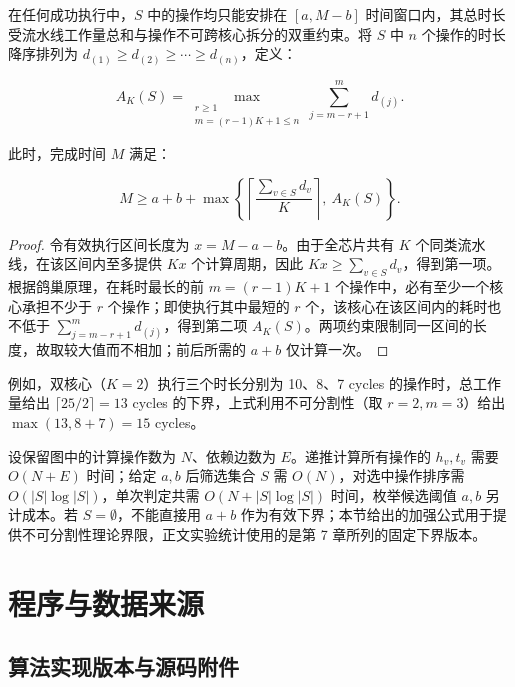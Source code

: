\documentclass[anonymous,withtoc]{gmcm2026}
\begin{document}
在任何成功执行中，\(S\) 中的操作均只能安排在 \([a, M - b]\) 时间窗口内，其总时长受流水线工作量总和与操作不可跨核心拆分的双重约束。将 \(S\) 中 \(n\) 个操作的时长降序排列为 \(d_{(1)} \ge d_{(2)} \ge \cdots \ge d_{(n)}\)，定义：

\begin{equation}
A_K(S) = \max_{\substack{r \ge 1 \\ m = (r-1)K+1 \le n}} \sum_{j=m-r+1}^{m} d_{(j)}.
\end{equation}

此时，完成时间 \(M\) 满足：

\begin{equation}
M \ge a + b + \max\left\{\left\lceil\frac{\sum_{v \in S} d_v}{K}\right\rceil, \ A_K(S)\right\}.
\end{equation}

\begin{proof} 令有效执行区间长度为 \(x = M - a - b\)。由于全芯片共有 \(K\) 个同类流水线，在该区间内至多提供 \(Kx\) 个计算周期，因此 \(Kx \ge \sum_{v \in S} d_v\)，得到第一项。根据鸽巢原理，在耗时最长的前 \(m = (r-1)K + 1\) 个操作中，必有至少一个核心承担不少于 \(r\) 个操作；即使执行其中最短的 \(r\) 个，该核心在该区间内的耗时也不低于 \(\sum_{j=m-r+1}^{m} d_{(j)}\)，得到第二项 \(A_K(S)\)。两项约束限制同一区间的长度，故取较大值而不相加；前后所需的 \(a + b\) 仅计算一次。 \end{proof}

例如，双核心（\(K=2\)）执行三个时长分别为 10、8、7 cycles 的操作时，总工作量给出 \(\lceil 25/2 \rceil = 13\) cycles 的下界，上式利用不可分割性（取 \(r=2, m=3\)）给出 \(\max(13, 8+7) = 15\) cycles。

设保留图中的计算操作数为 \(N\)、依赖边数为 \(E\)。递推计算所有操作的 \(h_v, t_v\) 需要 \(O(N + E)\) 时间；给定 \(a, b\) 后筛选集合 \(S\) 需 \(O(N)\)，对选中操作排序需 \(O(|S| \log |S|)\)，单次判定共需 \(O(N + |S| \log |S|)\) 时间，枚举候选阈值 \(a, b\) 另计成本。若 \(S = \emptyset\)，不能直接用 \(a + b\) 作为有效下界；本节给出的加强公式用于提供不可分割性理论界限，正文实验统计使用的是第 7 章所列的固定下界版本。

\section{程序与数据来源}

\subsection{算法实现版本与源码附件}
\end{document}

